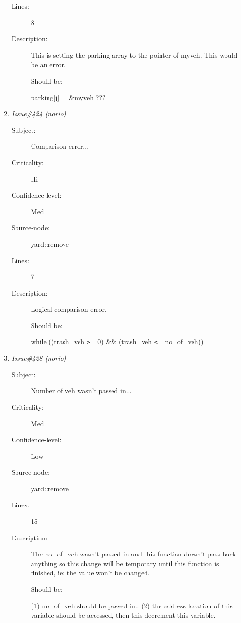 \begin{enumerate}
\begin{description}
\item [Lines:] 8

\item [Description:] This is setting the parking array to the pointer of
 myveh. This would be an error.

 Should be:

 parking[j] = \&myveh ???
\end{description}
\item {\it Issue\#424 (norio)}
\begin{description}
\item [Subject:] Comparison error...
\item [Criticality:] Hi
\item [Confidence-level:] Med
\item [Source-node:] yard::remove

\item [Lines:] 7

\item [Description:] Logical comparison error,

 Should be:

 while ((trash\_veh {\tt >}= 0) \&\& (trash\_veh {\tt <}= no\_of\_veh))
\end{description}
\item {\it Issue\#428 (norio)}
\begin{description}
\item [Subject:] Number of veh wasn't passed in...
\item [Criticality:] Med
\item [Confidence-level:] Low
\item [Source-node:] yard::remove

\item [Lines:] 15

\item [Description:] The no\_of\_veh wasn't passed in and this function doesn't
 pass back anything so this change will be temporary until
 this function is finished, ie: the value won't be changed.

 Should be:

 (1) no\_of\_veh should be passed in..
 (2) the address location of this variable should be
     accessed, then this decrement this variable.
\end{description}
\end{enumerate}
